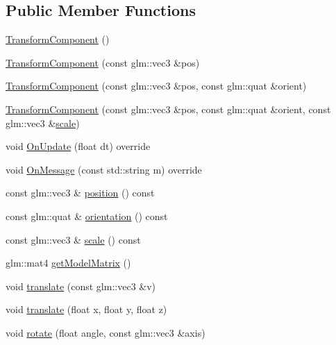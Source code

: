 \subsection*{Public Member Functions}
\begin{DoxyCompactItemize}
\item 
\mbox{\hyperlink{class_transform_component_ace1cf2d7d2a7468e9cb3eb0ce382f446}{Transform\+Component}} ()
\item 
\mbox{\hyperlink{class_transform_component_a01037615eda19c3bbb51c99094839574}{Transform\+Component}} (const glm\+::vec3 \&pos)
\item 
\mbox{\hyperlink{class_transform_component_a05ce9d2b5a350a5d8d67ce6b323818d4}{Transform\+Component}} (const glm\+::vec3 \&pos, const glm\+::quat \&orient)
\item 
\mbox{\hyperlink{class_transform_component_aa823162adc73870484409dcdb8cc95f3}{Transform\+Component}} (const glm\+::vec3 \&pos, const glm\+::quat \&orient, const glm\+::vec3 \&\mbox{\hyperlink{class_transform_component_a4b04c6a025c6be6bd0b9400827ee2291}{scale}})
\item 
void \mbox{\hyperlink{class_transform_component_ab763f5af77fcb5eee0e725c219901fa3}{On\+Update}} (float dt) override
\item 
void \mbox{\hyperlink{class_transform_component_ac250c4b7e47e639d0f8693d04c9b5051}{On\+Message}} (const std\+::string m) override
\item 
const glm\+::vec3 \& \mbox{\hyperlink{class_transform_component_a1f236ca0fb57ccb2a5e1238502a880ac}{position}} () const
\item 
const glm\+::quat \& \mbox{\hyperlink{class_transform_component_a7655d65aee0cb5dc459e8f632c80a6d1}{orientation}} () const
\item 
const glm\+::vec3 \& \mbox{\hyperlink{class_transform_component_a4b04c6a025c6be6bd0b9400827ee2291}{scale}} () const
\item 
glm\+::mat4 \mbox{\hyperlink{class_transform_component_a5fc531fdaba497dfb2013edce34cb094}{get\+Model\+Matrix}} ()
\item 
void \mbox{\hyperlink{class_transform_component_af6ff15b431e0959b26714037f4b5e5e9}{translate}} (const glm\+::vec3 \&v)
\item 
void \mbox{\hyperlink{class_transform_component_af495b5a63ba61ac9f67170ecf30769ac}{translate}} (float x, float y, float z)
\item 
void \mbox{\hyperlink{class_transform_component_a54f3f0e7924028bb32279aac3938a149}{rotate}} (float angle, const glm\+::vec3 \&axis)

\end{DoxyCompactItemize}
